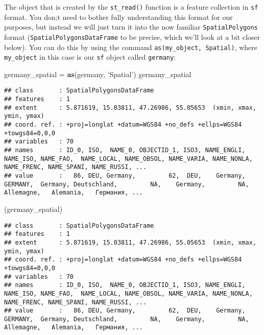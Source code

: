 \documentclass[]{article}
\newenvironment{Shaded}{\begin{snugshade}}{\end{snugshade}}
\newcommand{\KeywordTok}[1]{\textcolor[rgb]{0.13,0.29,0.53}{\textbf{#1}}}
\newcommand{\NormalTok}[1]{#1}
\newcommand{\StringTok}[1]{\textcolor[rgb]{0.31,0.60,0.02}{#1}}
\begin{document}
The object that is created by the \texttt{st\_read()} function is a
feature collection in \texttt{sf} format. You don;t need to bother fully
understanding this format for our purposes, but instead we will just
turn it into the now familiar \texttt{SpatialPolygons} format
(\texttt{SpatialPolygonsDataFrame} to be precise, which we'll look at a
bit closer below). You can do this by using the command
\texttt{as(my\_object,\ \textquotesingle{}Spatial\textquotesingle{})},
where \texttt{my\_object} in this case is our \texttt{sf} object called
\texttt{germany}:

\begin{Shaded}
\begin{Highlighting}[]
\NormalTok{germany_spatial =}\StringTok{ }\KeywordTok{as}\NormalTok{(germany, }\StringTok{'Spatial'}\NormalTok{)}
\NormalTok{germany_spatial}
\end{Highlighting}
\end{Shaded}

\begin{verbatim}
## class       : SpatialPolygonsDataFrame 
## features    : 1 
## extent      : 5.871619, 15.03811, 47.26986, 55.05653  (xmin, xmax, ymin, ymax)
## coord. ref. : +proj=longlat +datum=WGS84 +no_defs +ellps=WGS84 +towgs84=0,0,0 
## variables   : 70
## names       : ID_0, ISO,  NAME_0, OBJECTID_1, ISO3, NAME_ENGLI, NAME_ISO, NAME_FAO,  NAME_LOCAL, NAME_OBSOL, NAME_VARIA, NAME_NONLA, NAME_FRENC, NAME_SPANI, NAME_RUSSI, ... 
## value       :   86, DEU, Germany,         62,  DEU,    Germany,  GERMANY,  Germany, Deutschland,         NA,    Germany,         NA,  Allemagne,   Alemania,   Германия, ...
\end{verbatim}

\begin{Shaded}
\begin{Highlighting}[]
\NormalTok{(germany_spatial)}
\end{Highlighting}
\end{Shaded}

\begin{verbatim}
## class       : SpatialPolygonsDataFrame 
## features    : 1 
## extent      : 5.871619, 15.03811, 47.26986, 55.05653  (xmin, xmax, ymin, ymax)
## coord. ref. : +proj=longlat +datum=WGS84 +no_defs +ellps=WGS84 +towgs84=0,0,0 
## variables   : 70
## names       : ID_0, ISO,  NAME_0, OBJECTID_1, ISO3, NAME_ENGLI, NAME_ISO, NAME_FAO,  NAME_LOCAL, NAME_OBSOL, NAME_VARIA, NAME_NONLA, NAME_FRENC, NAME_SPANI, NAME_RUSSI, ... 
## value       :   86, DEU, Germany,         62,  DEU,    Germany,  GERMANY,  Germany, Deutschland,         NA,    Germany,         NA,  Allemagne,   Alemania,   Германия, ...
\end{verbatim}
\end{document}
